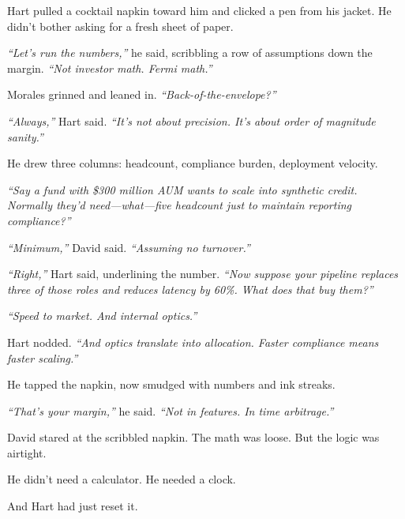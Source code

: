 Hart pulled a cocktail napkin toward him and clicked a pen from his jacket. He didn’t bother asking for a fresh sheet of paper.

\textit{``Let’s run the numbers,''} he said, scribbling a row of assumptions down the margin. \textit{``Not investor math. 
Fermi math.''}

Morales grinned and leaned in. \textit{``Back-of-the-envelope?''}

\textit{``Always,''} Hart said. \textit{``It’s not about precision. It’s about order of magnitude sanity.''}

He drew three columns: headcount, compliance burden, deployment velocity.

\textit{``Say a fund with \$300 million AUM wants to scale into synthetic credit. Normally they’d need---what---five headcount 
just to maintain reporting compliance?''}

\textit{``Minimum,''} David said. \textit{``Assuming no turnover.''}

\textit{``Right,''} Hart said, underlining the number. \textit{``Now suppose your pipeline replaces three of those roles 
and reduces latency by 60\%. What does that buy them?''}

\textit{``Speed to market. And internal optics.''}

Hart nodded. \textit{``And optics translate into allocation. Faster compliance means faster scaling.''}

He tapped the napkin, now smudged with numbers and ink streaks.

\textit{``That’s your margin,''} he said. \textit{``Not in features. In time arbitrage.''}

David stared at the scribbled napkin. The math was loose. But the logic was airtight.

He didn’t need a calculator. He needed a clock.

And Hart had just reset it.

\medskip


